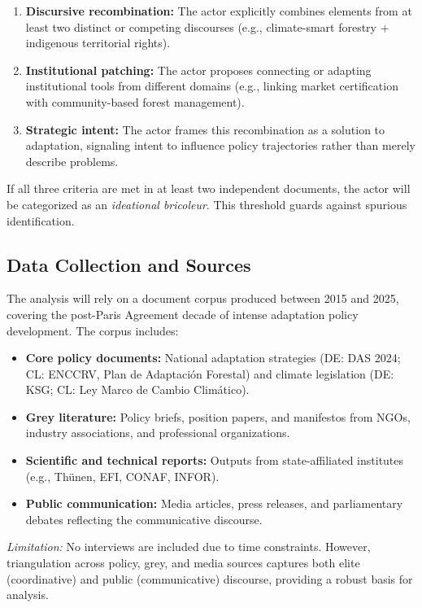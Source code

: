 \begin{enumerate}
    \item \textbf{Discursive recombination:} The actor explicitly combines elements from 
    at least two distinct or competing discourses (e.g., climate-smart forestry + 
    indigenous territorial rights).
    \item \textbf{Institutional patching:} The actor proposes connecting or adapting 
    institutional tools from different domains (e.g., linking market certification 
    with community-based forest management).
    \item \textbf{Strategic intent:} The actor frames this recombination as a solution 
    to adaptation, signaling intent to influence policy trajectories rather than merely 
    describe problems.
\end{enumerate}

If all three criteria are met in at least two independent documents, the actor will 
be categorized as an \textit{ideational bricoleur}. This threshold guards against 
spurious identification.

\subsection*{Data Collection and Sources}
The analysis will rely on a document corpus produced between 2015 and 2025, 
covering the post-Paris Agreement decade of intense adaptation policy development. 
The corpus includes:

\begin{itemize}
    \item \textbf{Core policy documents:} National adaptation strategies 
    (DE: DAS 2024; CL: ENCCRV, Plan de Adaptación Forestal) and climate legislation 
    (DE: KSG; CL: Ley Marco de Cambio Climático).
    \item \textbf{Grey literature:} Policy briefs, position papers, and manifestos 
    from NGOs, industry associations, and professional organizations.
    \item \textbf{Scientific and technical reports:} Outputs from state-affiliated 
    institutes (e.g., Thünen, EFI, CONAF, INFOR).
    \item \textbf{Public communication:} Media articles, press releases, and 
    parliamentary debates reflecting the communicative discourse.
\end{itemize}

\textit{Limitation:} No interviews are included due to time constraints. However, 
triangulation across policy, grey, and media sources captures both elite 
(coordinative) and public (communicative) discourse, providing a robust basis for 
analysis.



